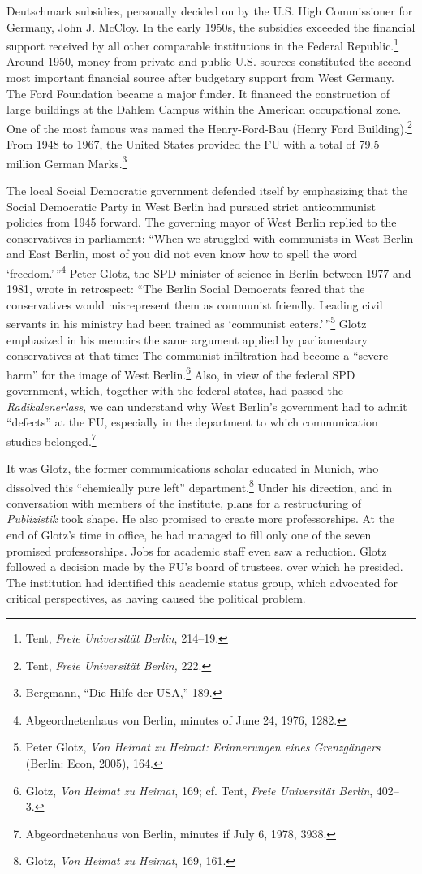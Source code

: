 \documentclass{tufte-handout}
\begin{document}
Deutschmark subsidies, personally decided on by the U.S. High
Commissioner for Germany, John J. McCloy. In the early 1950s, the
subsidies exceeded the financial support received by all other
comparable institutions in the Federal Republic.\footnote{Tent,
  \emph{Freie Universität Berlin}, 214--19.} Around 1950, money from
private and public U.S. sources constituted the second most important
financial source after budgetary support from West Germany. The Ford
Foundation became a major funder. It financed the construction of large
buildings at the Dahlem Campus within the American occupational zone.
One of the most famous was named the Henry-Ford-Bau (Henry Ford
Building).\footnote{Tent, \emph{Freie Universität Berlin,} 222.} From
1948 to 1967, the United States provided the FU with a total of 79.5
million German Marks.\footnote{Bergmann, ``Die Hilfe der USA,'' 189.}

The local Social Democratic government defended itself by emphasizing
that the Social Democratic Party in West Berlin had pursued strict
anticommunist policies from 1945 forward. The governing mayor of West
Berlin replied to the conservatives in parliament: ``When we struggled
with communists in West Berlin and East Berlin, most of you did not even
know how to spell the word `freedom.'\,''\footnote{Abgeordnetenhaus von
  Berlin, minutes of June 24, 1976, 1282.} Peter Glotz, the SPD minister
of science in Berlin between 1977 and 1981, wrote in retrospect: ``The
Berlin Social Democrats feared that the conservatives would misrepresent
them as communist friendly. Leading civil servants in his ministry had
been trained as `communist eaters.'\,''\footnote{Peter Glotz, \emph{Von
  Heimat zu Heimat: Erinnerungen eines Grenzgängers} (Berlin: Econ,
  2005), 164.} Glotz emphasized in his memoirs the same argument applied
by parliamentary conservatives at that time: The communist infiltration
had become a ``severe harm'' for the image of West Berlin.\footnote{Glotz,
  \emph{Von Heimat zu Heimat}, 169; cf. Tent, \emph{Freie Universität
  Berlin}, 402--3.} Also, in view of the federal SPD government, which,
together with the federal states, had passed the \emph{Radikalenerlass},
we can understand why West Berlin's government had to admit ``defects''
at the FU, especially in the department to which communication studies
belonged.\footnote{Abgeordnetenhaus von Berlin, minutes if July 6, 1978,
  3938.}

\newpage  

It was Glotz, the former communications scholar educated in Munich, who
dissolved this ``chemically pure left'' department.\footnote{Glotz,
  \emph{Von Heimat zu Heimat}, 169, 161.} Under his direction, and in
conversation with members of the institute, plans for a restructuring of
\emph{Publizistik} took shape. He also promised to create more
professorships. At the end of Glotz's time in office, he had managed to
fill only one of the seven promised professorships. Jobs for academic
staff even saw a reduction. Glotz followed a decision made by the FU's
board of trustees, over which he presided. The institution had
identified this academic status group, which advocated for critical
perspectives, as having caused the political problem.
\end{document}
